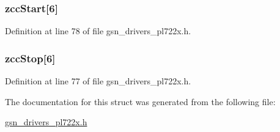 \hypertarget{a00453_ab73b1acc5f46baf8a7e24aa38f6df74d}{
\subsubsection[{zccStart}]{ {\bf zccStart}\mbox{[}6\mbox{]}}}
\label{a00453_ab73b1acc5f46baf8a7e24aa38f6df74d}


Definition at line 78 of file gsn\_\-drivers\_\-pl722x.h.

\hypertarget{a00453_a3347e23a9104c0610144e76e973ef77b}{
\subsubsection[{zccStop}]{ {\bf zccStop}\mbox{[}6\mbox{]}}}
\label{a00453_a3347e23a9104c0610144e76e973ef77b}


Definition at line 77 of file gsn\_\-drivers\_\-pl722x.h.



The documentation for this struct was generated from the following file:\begin{DoxyCompactItemize}
\item 
\hyperlink{a00486}{gsn\_\-drivers\_\-pl722x.h}\end{DoxyCompactItemize}

